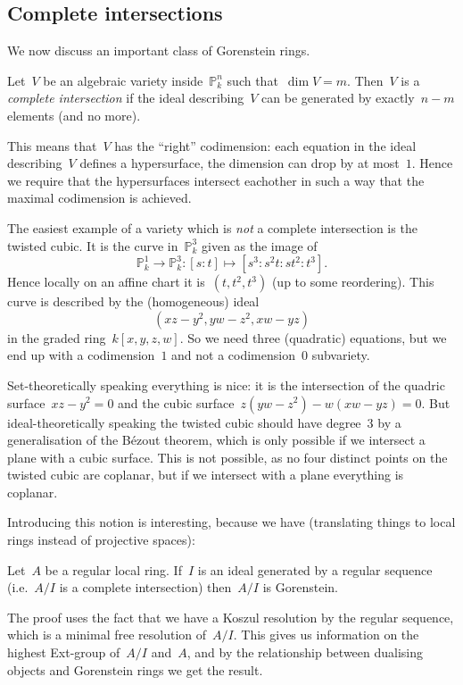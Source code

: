 \documentclass[10pt,a4paper]{article}
\begin{document}
\subsection{Complete intersections}
We now discuss an important class of Gorenstein rings.
\begin{definition}
  Let~$V$ be an algebraic variety inside~$\mathbb{P}_k^n$ such that~$\dim V=m$. Then~$V$ is a \emph{complete intersection} if the ideal describing~$V$ can be generated by exactly~$n-m$ elements (and no more).
\end{definition}
This means that~$V$ has the ``right'' codimension: each equation in the ideal describing~$V$ defines a hypersurface, the dimension can drop by at most~$1$. Hence we require that the hypersurfaces intersect eachother in such a way that the maximal codimension is achieved.
\begin{example}
\end{example}
\begin{example}
  The easiest example of a variety which is \emph{not} a complete intersection is the twisted cubic. It is the curve in~$\mathbb{P}_k^3$ given as the image of
  \begin{equation}
    \mathbb{P}_k^1\to\mathbb{P}_k^3:[s:t]\mapsto[s^3:s^2t:st^2:t^3].
  \end{equation}
  Hence locally on an affine chart it is~$(t,t^2,t^3)$ (up to some reordering). This curve is described by the (homogeneous) ideal
  \begin{equation}
    (xz-y^2,yw-z^2,xw-yz)
  \end{equation}
  in the graded ring~$k[x,y,z,w]$. So we need three (quadratic) equations, but we end up with a codimension~$1$ and not a codimension~$0$ subvariety.

  Set-theoretically speaking everything is nice: it is the intersection of the quadric surface~$xz-y^2=0$ and the cubic surface~$z(yw-z^2)-w(xw-yz)=0$. But ideal-theoretically speaking the twisted cubic should have degree~$3$ by a generalisation of the B\'ezout theorem, which is only possible if we intersect a plane with a cubic surface. This is not possible, as no four distinct points on the twisted cubic are coplanar, but if we intersect with a plane everything is coplanar.
\end{example}
Introducing this notion is interesting, because we have \cite[corollary 21.19]{eisenbud-commutative-algebra} (translating things to local rings instead of projective spaces):
\begin{theorem}
  \label{theorem:complete-intersections-are-Gorenstein}
  Let~$A$ be a regular local ring. If~$I$ is an ideal generated by a regular sequence (i.e.\ $A/I$ is a complete intersection) then~$A/I$ is Gorenstein.
\end{theorem}
The proof uses the fact that we have a Koszul resolution by the regular sequence, which is a minimal free resolution of~$A/I$. This gives us information on the highest Ext-group of~$A/I$ and~$A$, and by the relationship between dualising objects and Gorenstein rings \cite[theorem 21.15]{eisenbud-commutative-algebra} we get the result.
\end{document}
